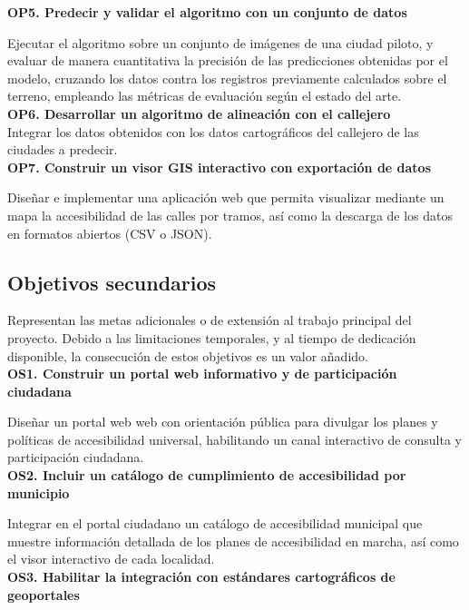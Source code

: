 \textbf{OP5. Predecir y validar el algoritmo con un conjunto de datos}

Ejecutar el algoritmo sobre un conjunto de imágenes de una ciudad piloto, y evaluar de manera cuantitativa la precisión de las predicciones obtenidas por el modelo, cruzando los datos contra los registros previamente calculados sobre el terreno, empleando las métricas de evaluación según el estado del arte.
\\

\textbf{OP6. Desarrollar un algoritmo de alineación con el callejero}
\\

Integrar los datos obtenidos con los datos cartográficos del callejero de las ciudades a predecir.
\\

\textbf{OP7. Construir un visor GIS interactivo con exportación de datos}

Diseñar e implementar una aplicación web que permita visualizar mediante un mapa la accesibilidad de las calles por tramos, así como la descarga de los datos en formatos abiertos (CSV o JSON).
\\

\subsection{Objetivos secundarios}

Representan las metas adicionales o de extensión al trabajo principal del proyecto. Debido a las limitaciones temporales, y al tiempo de dedicación disponible, la consecución de estos objetivos es un valor añadido.
\\

\textbf{OS1. Construir un portal web informativo y de participación ciudadana}

Diseñar un portal web web con orientación pública para divulgar los planes y políticas de accesibilidad universal, habilitando un canal interactivo de consulta y participación ciudadana.
\\

\textbf{OS2. Incluir un catálogo de cumplimiento de accesibilidad por municipio}

Integrar en el portal ciudadano un catálogo de accesibilidad municipal que muestre información detallada de los planes de accesibilidad en marcha, así como el visor interactivo de cada localidad.
\\

\textbf{OS3. Habilitar la integración con estándares cartográficos de geoportales}

